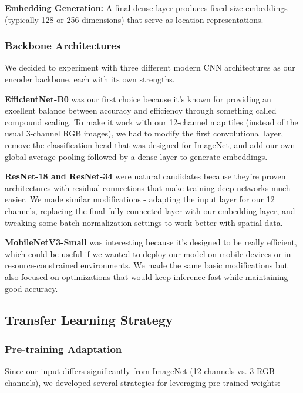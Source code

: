 \textbf{Embedding Generation:} A final dense layer produces fixed-size embeddings (typically 128 or 256 dimensions) that serve as location representations.

\subsubsection{Backbone Architectures}

We decided to experiment with three different modern CNN architectures as our encoder backbone, each with its own strengths.

\textbf{EfficientNet-B0} was our first choice because it's known for providing an excellent balance between accuracy and efficiency through something called compound scaling. To make it work with our 12-channel map tiles (instead of the usual 3-channel RGB images), we had to modify the first convolutional layer, remove the classification head that was designed for ImageNet, and add our own global average pooling followed by a dense layer to generate embeddings.

\textbf{ResNet-18 and ResNet-34} were natural candidates because they're proven architectures with residual connections that make training deep networks much easier. We made similar modifications - adapting the input layer for our 12 channels, replacing the final fully connected layer with our embedding layer, and tweaking some batch normalization settings to work better with spatial data.

\textbf{MobileNetV3-Small} was interesting because it's designed to be really efficient, which could be useful if we wanted to deploy our model on mobile devices or in resource-constrained environments. We made the same basic modifications but also focused on optimizations that would keep inference fast while maintaining good accuracy.

\subsection{Transfer Learning Strategy}

\subsubsection{Pre-training Adaptation}

Since our input differs significantly from ImageNet (12 channels vs. 3 RGB channels), we developed several strategies for leveraging pre-trained weights:

